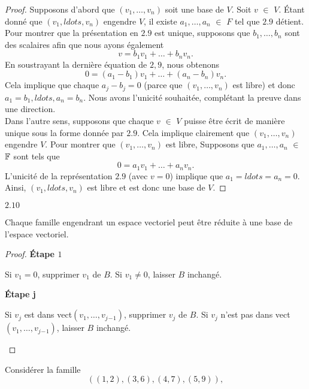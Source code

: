\documentclass[12pt]{book}
\begin{document}
\begin{proof}
Supposons d’abord que $(v_1,\ldots,v_n)$ soit une base de $V$. Soit $v$ $\in$ $V$. Étant donné que $(v_1,ldots,v_n)$ engendre $V$, il existe $a_1,\ldots,a_n$ $\in$ $F$ tel que $2.9$ détient. Pour montrer que la présentation en $2.9$ est unique, supposons que $b_1,\ldots,b_n$ sont des scalaires afin que nous ayons \'egalement
\begin{equation*}
    v = b_1v_1 + \ldots + b_nv_n.
\end{equation*}
En soustrayant la derni\`ere \'equation de $2,9 $, nous obtenons
\begin{equation*}
    0 = (a_1-b_1)v_1 + \ldots + (a_n-b_n)v_n.
\end{equation*}
Cela implique que chaque $a_j-b_j = 0$ (parce que $(v_1,\ldots,v_n)$ est libre) et donc $a_1 = b_1, ldots, a_n = b_n$. Nous avons l’unicit\'e souhait\'ee, compl\'etant la preuve dans une direction.\\
\indent
Dans l’autre sens, supposons que chaque $v$ $\in$ $V$ puisse \^ etre \'ecrit de mani\`ere unique sous la forme donn\'ee par $2.9$. Cela implique clairement que $(v_1,\ldots,v_n)$ engendre $V$. Pour montrer que $(v_1,\ldots,v_n)$ est libre, Supposons que $a_1,\ldots,a_n$ $\in$ $\mathbb{F}$ sont tels que
\begin{equation*}
    0 = a_1v_1 + \ldots + a_nv_n.
\end{equation*}
L’unicit\'e de la repr\'esentation $2.9$ (avec $v = 0$) implique que $a_1 = ldots= a_n = 0$. Ainsi, $(v_1,ldots,v_n)$ est libre et est donc une base de $V$.
\end{proof}
$\bm{2.10}$
\begin{thm}
\indent Chaque famille engendrant un espace vectoriel peut \^etre réduite \`a une base de l’espace vectoriel.
\end{thm}
\begin{proof}
\textbf{\'Etape $1$}
\begin{indpar}
Si $v_1 = 0$, supprimer $v_1$ de $B$. Si $v_1 \ne 0$, laisser $B$ inchangé.
\end{indpar}
\textbf{\'Etape j}
\begin{indpar}
Si $v_j$ est dans vect$(v_1,\ldots,v_j{_-}_1)$, supprimer $v_j$ de $B$. Si $v_j$ n'est pas dans vect$(v_1,\ldots,v_j{_-}_1)$, laisser $B$ inchang\'e.
\end{indpar}


\end{proof}
Consid\'erer la famille 
\begin{equation*}
    ((1,2),(3,6),(4,7),(5,9)),
\end{equation*}
\end{document}
